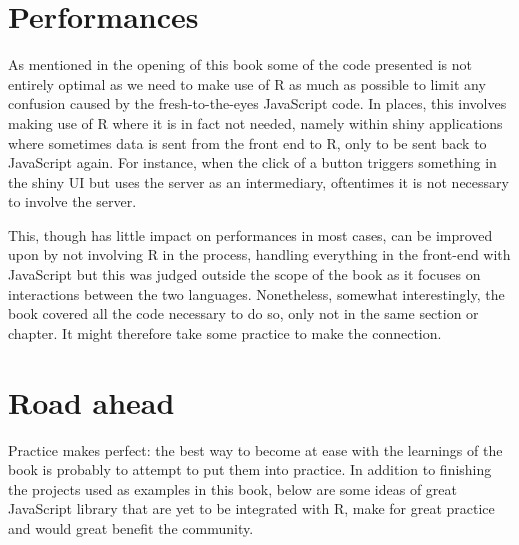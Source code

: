 \documentclass[
]{krantz}
\makeatletter
\newenvironment{Shaded}{\begin{snugshade}}{\end{snugshade}}
\newcommand{\AttributeTok}[1]{\textcolor[rgb]{0.61,0.61,0.61}{#1}}
\newcommand{\CommentTok}[1]{\textcolor[rgb]{0.37,0.37,0.37}{\textit{#1}}}
\newcommand{\KeywordTok}[1]{\textcolor[rgb]{0.27,0.27,0.27}{\textbf{#1}}}
\newcommand{\NormalTok}[1]{#1}
\newcommand{\OperatorTok}[1]{\textcolor[rgb]{0.43,0.43,0.43}{\textbf{#1}}}
\newcommand{\StringTok}[1]{\textcolor[rgb]{0.5,0.5,0.5}{#1}}
\newenvironment{kframe}{%
\medskip{}
\setlength{\fboxsep}{.8em}
 \def\at@end@of@kframe{}%
 \ifinner\ifhmode%
  \def\at@end@of@kframe{\end{minipage}}%
  \begin{minipage}{\columnwidth}%
 \fi\fi%
 \def\FrameCommand##1{\hskip\@totalleftmargin \hskip-\fboxsep
 \colorbox{shadecolor}{##1}\hskip-\fboxsep
     \hskip-\linewidth \hskip-\@totalleftmargin \hskip\columnwidth}%
 \MakeFramed {\advance\hsize-\width
   \@totalleftmargin\z@ \linewidth\hsize
   \@setminipage}}%
 {\par\unskip\endMakeFramed%
 \at@end@of@kframe}
\renewenvironment{Shaded}{\begin{kframe}}{\end{kframe}}
\makeatother
\begin{document}
\hypertarget{performances}{%
\section{Performances}\label{performances}}

As mentioned in the opening of this book some of the code presented is not entirely optimal as we need to make use of R as much as possible to limit any confusion caused by the fresh-to-the-eyes JavaScript code. In places, this involves making use of R where it is in fact not needed, namely within shiny applications where sometimes data is sent from the front end to R, only to be sent back to JavaScript again. For instance, when the click of a button triggers something in the shiny UI but uses the server as an intermediary, oftentimes it is not necessary to involve the server.

This, though has little impact on performances in most cases, can be improved upon by not involving R in the process, handling everything in the front-end with JavaScript but this was judged outside the scope of the book as it focuses on interactions between the two languages. Nonetheless, somewhat interestingly, the book covered all the code necessary to do so, only not in the same section or chapter. It might therefore take some practice to make the connection.

\begin{Shaded}
\end{Shaded}

\hypertarget{road-ahead}{%
\section{Road ahead}\label{road-ahead}}

Practice makes perfect: the best way to become at ease with the learnings of the book is probably to attempt to put them into practice. In addition to finishing the projects used as examples in this book, below are some ideas of great JavaScript library that are yet to be integrated with R, make for great practice and would great benefit the community.
\end{document}
